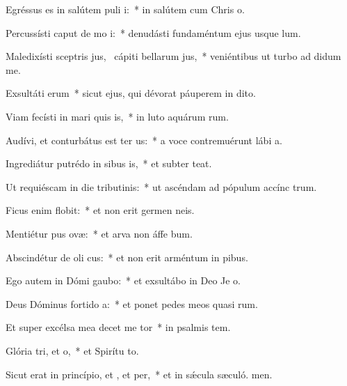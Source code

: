 \item Egréssus es in salútem puli i:~* in salútem cum Chris o.
\item Percussísti caput de mo i:~* denudásti fundaméntum ejus usque  lum.
\item Maledixísti sceptris jus,~\pscross{} cápiti bellarum jus,~* veniéntibus ut turbo ad didum me.
\item Exsultáti erum~* sicut ejus, qui dévorat páuperem in dito.
\item Viam fecísti in mari quis is,~* in luto aquárum rum.
\item Audívi, et conturbátus est ter us:~* a voce contremuérunt lábi a.
\item Ingrediátur putrédo in sibus is,~* et subter  teat.
\item Ut requiéscam in die tributinis:~* ut ascéndam ad pópulum accínc trum.
\item Ficus enim  flobit:~* et non erit germen  neis.
\item Mentiétur pus ovæ:~* et arva non áffe bum.
\item Abscindétur de oli cus:~* et non erit arméntum in pibus.
\item Ego autem in Dómi gaubo:~* et exsultábo in Deo Je o.
\item Deus Dóminus fortido a:~* et ponet pedes meos quasi rum.
\item Et super excélsa mea decet me tor~* in psalmis tem.
\item Glória tri, et o,~* et Spirítu to.
\item Sicut erat in princípio, et , et per,~* et in sǽcula sæculó. men.
